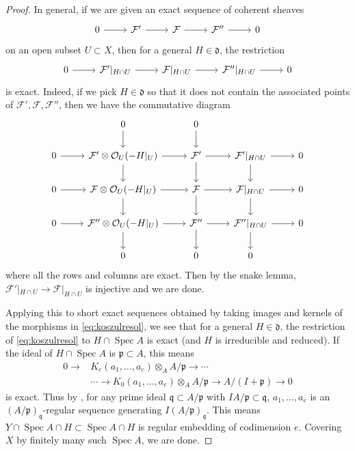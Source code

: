 \documentclass[12pt]{amsart}
\theoremstyle{plain}
\theoremstyle{definition}
\numberwithin{equation}{section}
\def\p{{ \mathfrak{p}}}
\def\q{{ \mathfrak{q}}}
\def\dd{{ \mathfrak{d}}}
\def\O{{ \mathcal{O}}}
\DeclareMathOperator{\Spec}{Spec}
\begin{document}
\begin{proof}
In general, if we are given an exact sequence of coherent sheaves 
\begin{equation}
\begin{tikzcd}
0 \arrow[r] & \mathcal{F}' \arrow[r] & \mathcal{F} \arrow[r] & \mathcal{F}'' \arrow[r] & 0
\end{tikzcd}
\end{equation}
on an open subset $U \subset X$, then for a general $H \in \dd$, the restriction
\begin{equation}
\begin{tikzcd}
0 \arrow[r] & \mathcal{F}'|_{H \cap U} \arrow[r] & \mathcal{F}|_{H \cap U} \arrow[r] & \mathcal{F}''|_{H \cap U} \arrow[r] & 0
\end{tikzcd}
\end{equation}
is exact.
Indeed, if we pick $H \in \dd$ so that it does not contain the associated points of 
$ \mathcal{F}', \mathcal{F}, \mathcal{F}''$, then we have the commutative diagram
\begin{equation}
\begin{tikzcd}
   & 							0    	\arrow[d]		&        0 	\arrow[d]	   &                                      &\\
0 \arrow[r] & \mathcal{F}' \otimes \O_{U}(-H|_{U})   \arrow[r] \arrow[d]  & \mathcal{F}'  \arrow[r] \arrow[d]& \mathcal{F}'|_{H \cap U} \arrow[r] \arrow[d]& 0\\
0 \arrow[r] & \mathcal{F} \otimes \O_{U}(-H|_{U})   \arrow[r] \arrow[d] & \mathcal{F}  \arrow[r] \arrow[d]& \mathcal{F}|_{H \cap U} \arrow[r] \arrow[d]& 0\\
0 \arrow[r] & \mathcal{F}'' \otimes \O_{U}(-H|_{U})   \arrow[r] \arrow[d] & \mathcal{F}''  \arrow[r] \arrow[d]& \mathcal{F}''|_{H \cap U} \arrow[r] \arrow[d]& 0\\
       & 							0    			&        0 	   	   &                   0                   &
\end{tikzcd}
\end{equation} 
where all the rows and columns are exact.
Then by the snake lemma, $ \mathcal{F}'|_{H \cap U} \to \mathcal{F}|_{H \cap U}$ is injective and we are done.

Applying this to short exact sequences obtained by taking images and kernels of the morphisms in 
\cref{eq:koszulresol}, we see that for a general $H \in \dd$, the restriction of \cref{eq:koszulresol}
to $H \cap \Spec A$ is exact (and $H$ is irreducible and reduced).
If the ideal of $H \cap \Spec A$ is $\p \subset A$, this means 
\begin{align}
0 \longrightarrow & K_{e}(a_{1},\dots,a_{e}) \otimes_{A} A/\p \longrightarrow \cdots \\
&\cdots \longrightarrow   K_{0}(a_{1},\dots,a_{e}) \otimes_{A} A/\p \longrightarrow A/(I + \p) \longrightarrow 0 
\end{align}
is exact.
Thus by \cite[Theorem 16.5]{MatRing}, for any prime ideal $\q \subset A/\p$ with $IA/\p \subset \q$,
$a_{1},\dots,a_{e}$ is an $(A/\p)_{\q}$-regular sequence generating $I(A/\p)_{\q}$. 
This means $Y \cap \Spec A \cap H \subset  \Spec A \cap H$ is regular embedding of codimension $e$.
Covering $X$ by finitely many such $\Spec A$, we are done.
\end{proof}
\end{document}
